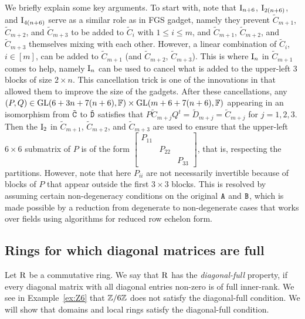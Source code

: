 \begin{example}
We briefly explain some key arguments. To start with, note that $\mathrm{I}_{n+6}$, $\mathrm{I}_{2(n+6)}$, and $\mathrm{I}_{4(n+6)}$ serve as a similar role as in FGS gadget, namely they prevent $\tilde C_{m+1}$, $\tilde C_{m+2}$, and $\tilde C_{m+3}$ to be added to $\tilde C_i$ with $1\leq i\leq m$, and $\tilde C_{m+1}$, $\tilde C_{m+2}$, and $\tilde C_{m+3}$ themselves mixing with each other. However, a linear combination of $\tilde C_i$, $i\in[m]$, can be added to $\tilde C_{m+1}$ (and $\tilde C_{m+2}$, $\tilde C_{m+3}$). This is where $\mathrm{I}_{n}$ in $\tilde C_{m+1}$ comes to help, namely $\mathrm{I}_{n}$ can be used to cancel what is added to the upper-left $3$ blocks of size $2\times n$. This cancellation trick is one of the innovations in \cite{TI4} that allowed them to improve the size of the gadgets. After these cancellations, any $(P, Q)\in\mathrm{GL}(6+3n+7(n+6), \mathbb{F})\times \mathrm{GL}(m+6+7(n+6), \mathbb{F})$ appearing in an isomorphism from $\tilde {\mathtt{C}}$ to $\tilde {\mathtt{D}}$ satisfies that $P\tilde C_{m+j} Q^t=\tilde D_{m+j}=\tilde C_{m+j}$ for $j=1, 2, 3$. Then the $\mathrm{I}_2$ in $\tilde C_{m+1}$, $\tilde C_{m+2}$, and $\tilde C_{m+3}$ are used to ensure that the upper-left $6\times 6$ submatrix of $P$ is of the form $\begin{bmatrix}
	P_{11} & & \\
	& P_{22} & \\
	& & P_{33}
\end{bmatrix}$, that is, respecting the partitions. However, note that here $P_{ii}$ are not necessarily invertible because of blocks of $P$ that appear outside the first $3 \times 3$ blocks. This is resolved by assuming certain non-degeneracy conditions on the original $\mathtt{A}$ and $\mathtt{B}$, which is made possible by a reduction from degenerate to non-degenerate cases that works over fields using algorithms for reduced row echelon form. 
\end{example}


\subsection{Rings for which diagonal matrices are full}\label{subsec:diagonal-full}

Let $\mathrm{R}$ be a commutative ring. We say that $\mathrm{R}$ has the \emph{diagonal-full} property, if every diagonal matrix with all diagonal entries non-zero is of full inner-rank. We see in Example~\ref{ex:Z6} that $\mathbb{Z}/6\mathbb{Z}$ does not satisfy the diagonal-full condition. We will show that domains and local rings satisfy the diagonal-full condition.


